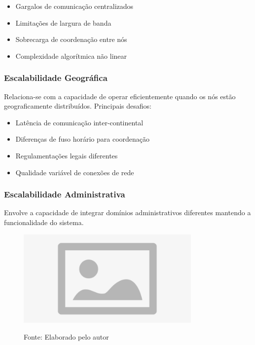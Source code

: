 \begin{itemize}
    \item Gargalos de comunicação centralizados
    \item Limitações de largura de banda
    \item Sobrecarga de coordenação entre nós
    \item Complexidade algorítmica não linear
\end{itemize}

\subsubsection{Escalabilidade Geográfica}

Relaciona-se com a capacidade de operar eficientemente quando os nós estão geograficamente distribuídos. Principais desafios:

\begin{itemize}
    \item Latência de comunicação inter-continental
    \item Diferenças de fuso horário para coordenação
    \item Regulamentações legais diferentes
    \item Qualidade variável de conexões de rede
\end{itemize}

\subsubsection{Escalabilidade Administrativa}

Envolve a capacidade de integrar domínios administrativos diferentes mantendo a funcionalidade do sistema.

\begin{figure}[H]
\centering
{}
\includegraphics[width=0.8\textwidth]{figure/placeholder.jpg}

\label{fig:escalabilidade_comparacao}
{\fontsize{10pt}{\baselineskip}\selectfont
Fonte: Elaborado pelo autor}
\end{figure}


